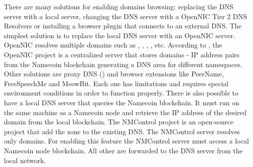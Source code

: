 There are many solutions for enabling  domains browsing: replacing the DNS server with a local server, changing the DNS server with a OpenNIC Tier 2 DNS Resolvers or installing a browser plugin that connects to an external DNS.
The simplest solution is to replace the local DNS server with an OpenNIC server. OpenNIC resolves multiple domains such as , , , , etc. According to \cite{opennic}, the OpenNIC project is a centralized server that stores  domains - IP address pairs from the Namecoin blockchain generating a DNS area for different namespaces.
Other solutions are proxy DNS () and browser extensions like PeerName, FreeSpeechMe and MeowBit. Each one has limitations and requires special environment conditions in order to function properly.
There is also possible to have a local DNS server that queries the Namecoin blockchain. It must run on the same machine as a Namecoin node and retrieve the IP address of the desired  domain from the local blockchain. The NMControl project is an open-source project that add the  zone to the existing DNS.
The NMControl server resolves only  domains. For enabling this feature the NMControl server must access a local Namecoin node blockchain. All other  are forwarded to the DNS server from the local network.









